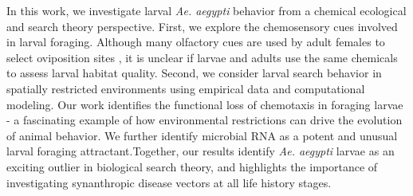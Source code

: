In this work, we investigate larval \textit{Ae. aegypti} behavior from a chemical ecological and search theory perspective. First, we explore the chemosensory cues involved in larval foraging. Although many olfactory cues are used by adult females to select oviposition sites \cite{Pavlovich2018-uv}, it is unclear if larvae and adults use the same chemicals to assess larval habitat quality. Second, we consider larval search behavior in spatially restricted environments using empirical data and computational modeling. Our work identifies the functional loss of chemotaxis in foraging larvae - a fascinating example of how environmental restrictions can drive the evolution of animal behavior. We further identify microbial RNA as a potent and unusual larval foraging attractant.Together, our results identify \textit{Ae. aegypti} larvae as an exciting outlier in biological search theory, and highlights the importance of investigating synanthropic disease vectors at all life history stages.